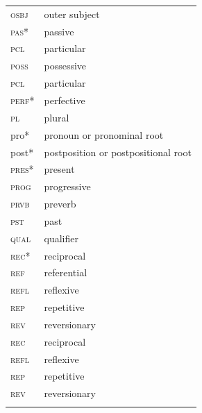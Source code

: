 \newpage
\begin{tabularx}{.45\textwidth}{lQ}
\textsc{osbj} & outer subject\\
\textsc{pas*} & passive\\
\textsc{pcl} & particular\\
\textsc{poss} & possessive\\
\textsc{pcl} & particular\\
\textsc{perf*} & perfective\\
\textsc{pl} & plural\\
{pro*} & pronoun or pronominal root\\
{post*} & postposition or postpositional root\\
\textsc{pres*} & present\\
\textsc{prog} & progressive\\
\textsc{prvb} & preverb \\
\textsc{pst} & past\\
\textsc{qual} & qualifier\\
\textsc{rec*} & reciprocal\\
\textsc{ref} & referential\\
\textsc{refl} & reflexive\\
\textsc{rep} & repetitive\\
\textsc{rev} & reversionary\\
\textsc{rec} & reciprocal\\
\textsc{refl} & reflexive\\
\textsc{rep} & repetitive\\
\textsc{rev} & reversionary\\
\\
\end{tabularx}
